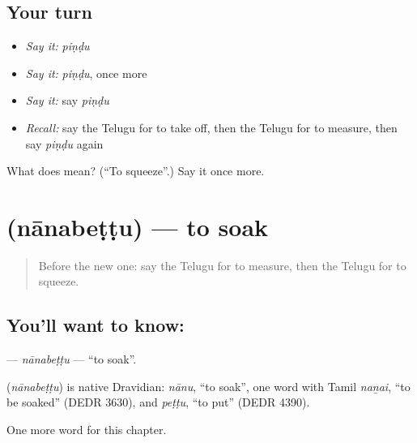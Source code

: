 \subsection*{Your turn}
\begin{itemize}
\raggedright
  \item \emph{Say it:} \emph{piṇḍu}
  \item \emph{Say it:} \emph{piṇḍu}, once more
  \item \emph{Say it:} say \emph{piṇḍu}
  \item \emph{Recall:} say the Telugu for to take off, then the Telugu for to measure, then say \emph{piṇḍu} again
\end{itemize}

\begin{tcolorbox}[breakable,colback=teal!4,colframe=teal!35!black,title={Before you move on}]
What does  mean? (\textquotedblleft{}To squeeze\textquotedblright{}.) Say it once more.
\end{tcolorbox}
\section[\texorpdfstring{\te{నానబెట్టు} (nānabeṭṭu)}{నానబెట్టు (nānabeṭṭu)}]{ (nānabeṭṭu) — to soak}

\label{lesson:TE-C159-nanabettu}



\begin{quote}
Before the new one: say the Telugu for to measure, then the Telugu for to squeeze.
\end{quote}

\subsection*{You'll want to know: }
\textbf{} — \emph{nānabeṭṭu} — \textquotedblleft{}to soak\textquotedblright{}.

\begin{cousinweb}
\textbf{} (\emph{nānabeṭṭu}) is native Dravidian: \emph{nānu}, \textquotedblleft{}to soak\textquotedblright{}, one word with Tamil \emph{naṉai}, \textquotedblleft{}to be soaked\textquotedblright{} (DEDR 3630), and \emph{peṭṭu}, \textquotedblleft{}to put\textquotedblright{} (DEDR 4390).
\end{cousinweb}

\begin{grammarlens}[title={What you've built}]
One more word for this chapter.
\end{grammarlens}

